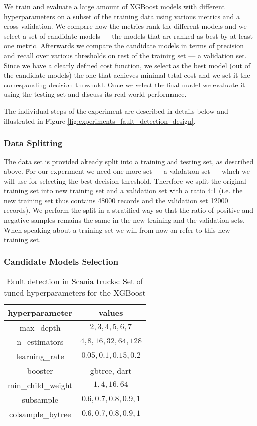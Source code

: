 We train and evaluate a large amount of XGBoost models with different hyperparameters on a subset of the training data using various metrics and a cross-validation.
We compare how the metrics rank the different models and we select a set of candidate models --- the models that are ranked as best by at least one metric.
Afterwards we compare the candidate models in terms of precision and recall over various thresholds on rest of the training set --- a validation set.
Since we have a clearly defined cost function, we select as the best model (out of the candidate models) the one that achieves minimal total cost and we set it the corresponding decision threshold.
Once we select the final model we evaluate it using the testing set and discuss its real-world performance.

The individual steps of the experiment are described in details below and illustrated in Figure \ref{fig:experiments_fault_detection_design}.

\subsubsection{Data Splitting}

The data set is provided already split into a training and testing set, as described above.
For our experiment we need one more set --- a validation set --- which we will use for selecting the best decision threshold.
Therefore we split the original training set into new training set and a validation set with a ratio 4:1 (i.e. the new training set thus contains 48000 records and the validation set 12000 records).
We perform the split in a stratified way so that the ratio of positive and negative samples remains the same in the new training and the validation sets.
When speaking about a training set we will from now on refer to this new training set.

\subsubsection{Candidate Models Selection}

\begin{table}
    \centering
    \begin{tabular}{cc}
    hyperparameter
    & values\\
    \hline
    max\_depth & ${2, 3, 4, 5, 6, 7}$\\
    n\_estimators & ${4, 8, 16, 32, 64, 128}$\\
    learning\_rate & ${0.05, 0.1, 0.15, 0.2}$\\
    booster & {gbtree, dart}\\
    min\_child\_weight & ${ 1,  4, 16, 64}$\\
    subsample & ${0.6, 0.7, 0.8, 0.9, 1}$\\
    colsample\_bytree & ${0.6, 0.7, 0.8, 0.9, 1}$\\
    \end{tabular}
    \caption{Fault detection in Scania trucks: Set of tuned hyperparameters for the XGBoost}
    \label{tab:experiments_fault_detection_aps_hyperparameters}
\end{table}


